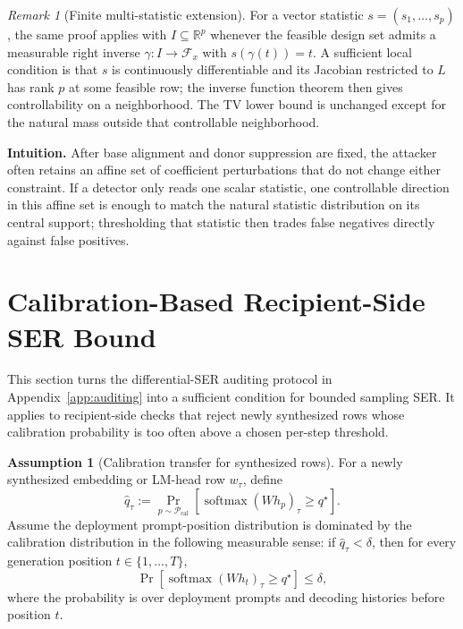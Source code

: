 \documentclass{article}
\theoremstyle{plain}
\theoremstyle{definition}
\newtheorem{assumption}[theorem]{Assumption}
\theoremstyle{remark}
\newtheorem{remark}[theorem]{Remark}
\begin{document}
\begin{remark}[Finite multi-statistic extension]
\label{rem:multi-statistic-detectors}
For a vector statistic $s=(s_1,\ldots,s_p)$, the same proof applies with $I\subseteq\mathbb{R}^p$ whenever the feasible design set admits a measurable right inverse $\gamma:I\to\mathcal{F}_x$ with $s(\gamma(t))=t$. A sufficient local condition is that $s$ is continuously differentiable and its Jacobian restricted to $L$ has rank $p$ at some feasible row; the inverse function theorem then gives controllability on a neighborhood. The TV lower bound is unchanged except for the natural mass outside that controllable neighborhood.
\end{remark}

\noindent\textbf{Intuition.}
After base alignment and donor suppression are fixed, the attacker often retains an affine set of coefficient perturbations that do not change either constraint. If a detector only reads one scalar statistic, one controllable direction in this affine set is enough to match the natural statistic distribution on its central support; thresholding that statistic then trades false negatives directly against false positives.

\section{Calibration-Based Recipient-Side SER Bound}
\label{app:recipient-side-defense-ser}

This section turns the differential-SER auditing protocol in Appendix~\ref{app:auditing} into a sufficient condition for bounded sampling SER. It applies to recipient-side checks that reject newly synthesized rows whose calibration probability is too often above a chosen per-step threshold.

\begin{assumption}[Calibration transfer for synthesized rows]
\label{ass:calibration-transfer}
For a newly synthesized embedding or LM-head row $w_\tau$, define
\[
\widehat{q}_\tau
:=
\Pr_{p\sim\mathcal{P}_{\mathrm{cal}}}
\left[
\operatorname{softmax}(Wh_p)_\tau\ge q^\star
\right].
\]
Assume the deployment prompt-position distribution is dominated by the calibration distribution in the following measurable sense: if $\widehat{q}_\tau<\delta$, then for every generation position $t\in\{1,\ldots,T\}$,
\[
\Pr\left[
\operatorname{softmax}(Wh_t)_\tau\ge q^\star
\right]
\le
\delta,
\]
where the probability is over deployment prompts and decoding histories before position $t$.
\end{assumption}
\end{document}
